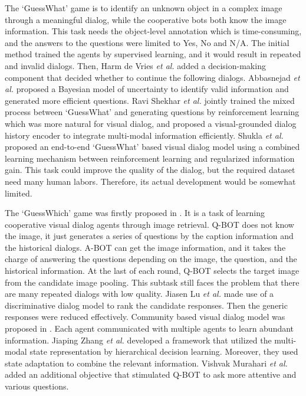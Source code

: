 \documentclass[review]{elsarticle}
\begin{document}
	The `GuessWhat' game is to identify an unknown object in a complex image through a meaningful dialog, while the cooperative bots both know the image information. This task needs the object-level annotation which is time-consuming, and the answers to the questions were limited to Yes, No and N/A.
	The initial method \cite{DBLP:conf/cvpr/VriesSCPLC17} trained the agents by supervised learning, and it would result in repeated and invalid dialogs. Then, Harm de Vries \textit{et al.} \cite{DBLP:conf/cvpr/VriesSCPLC17} added a decision-making component that decided whether to continue the following dialogs. 
	Abbasnejad \textit{et al.} \cite{abbasnejad2019s} proposed a Bayesian model of uncertainty to identify valid information and generated more efficient questions.
	Ravi Shekhar \textit{et al.} \cite{DBLP:conf/naacl/ShekharVBBPBF19} jointly trained the mixed process between `GuessWhat' and generating questions by reinforcement learning which was more natural for visual dialog, and proposed a visual-grounded dialog history encoder to integrate multi-modal information efficiently. 
	Shukla \textit{et al.} \cite{shukla2019should} proposed an end-to-end `GuessWhat' based visual dialog model using a combined learning mechanism between reinforcement learning and regularized information gain. 
	This task could improve the quality of the dialog, but the required dataset need many human labors. Therefore, its actual development would be somewhat limited. 
	
	The `GuessWhich' game was firstly proposed in \cite{DBLP:conf/iccv/DasKMLB17}. It is a task of learning cooperative visual dialog agents through image retrieval. Q-BOT does not know the image, it just generates a series of questions by the caption information and the historical dialogs. A-BOT can get the image information, and it takes the charge of answering the questions depending on the image, the question, and the historical information. 
	At the last of each round, Q-BOT selects the target image from the candidate image pooling. This subtask still faces the problem that there are many repeated dialogs with low quality. 
	Jiasen Lu \textit{et al.} \cite{DBLP:conf/nips/LuKYPB17} made use of a discriminative dialog model to rank the candidate responses. Then the generic responses were reduced effectively. 
	Community based visual dialog model was proposed in \cite{DBLP:conf/atal/AgarwalGSLS19}. Each agent communicated with multiple agents to learn abundant information. 
	Jiaping Zhang \textit{et al.} \cite{DBLP:conf/sigdial/ZhangZY18} developed a framework that utilized the multi-modal state representation by hierarchical decision learning. Moreover, they used state adaptation to combine the relevant information. 
	Vishvak Murahari \textit{et al.} \cite{DBLP:conf/emnlp/MurahariCBPD19} added an additional objective that stimulated Q-BOT to ask more attentive and various questions.
	
\end{document}
